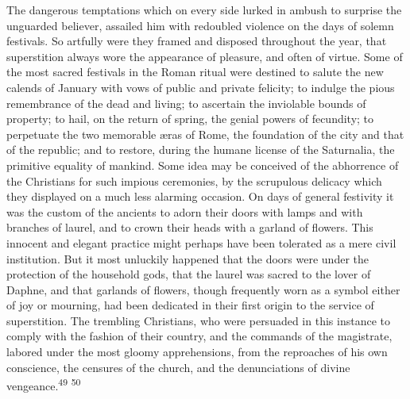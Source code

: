 


The dangerous temptations which on every side lurked in ambush to
surprise the unguarded believer, assailed him with redoubled
violence on the days of solemn festivals. So artfully were they
framed and disposed throughout the year, that superstition always
wore the appearance of pleasure, and often of virtue. Some of the
most sacred festivals in the Roman ritual were destined to salute
the new calends of January with vows of public and private
felicity; to indulge the pious remembrance of the dead and
living; to ascertain the inviolable bounds of property; to hail,
on the return of spring, the genial powers of fecundity; to
perpetuate the two memorable æras of Rome, the foundation of the
city and that of the republic; and to restore, during the humane
license of the Saturnalia, the primitive equality of mankind.
Some idea may be conceived of the abhorrence of the Christians
for such impious ceremonies, by the scrupulous delicacy which
they displayed on a much less alarming occasion. On days of
general festivity it was the custom of the ancients to adorn
their doors with lamps and with branches of laurel, and to crown
their heads with a garland of flowers. This innocent and elegant
practice might perhaps have been tolerated as a mere civil
institution. But it most unluckily happened that the doors were
under the protection of the household gods, that the laurel was
sacred to the lover of Daphne, and that garlands of flowers,
though frequently worn as a symbol either of joy or mourning, had
been dedicated in their first origin to the service of
superstition. The trembling Christians, who were persuaded in
this instance to comply with the fashion of their country, and
the commands of the magistrate, labored under the most gloomy
apprehensions, from the reproaches of his own conscience, the
censures of the church, and the denunciations of divine
vengeance.\textsuperscript{49} \textsuperscript{50}

